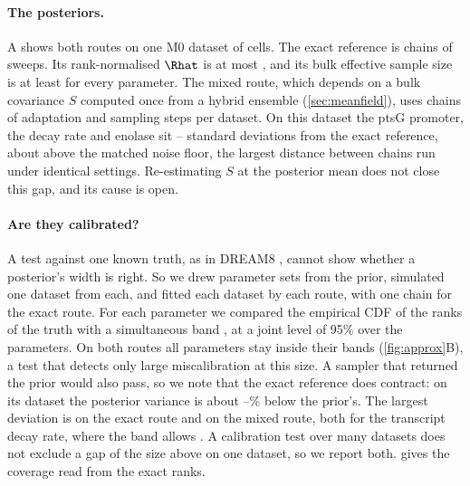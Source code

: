 \paragraph{The posteriors.} A shows both routes on one M0 dataset of
 cells. The exact reference is  chains of  sweeps. Its rank-normalised $\Rhat$
\cite{vehtari2021rank} is at most , and its bulk effective sample
size is at least  for every parameter. The mixed route, which depends on a bulk covariance $S$ computed once from a hybrid ensemble (\cref{sec:meanfield}), uses
 chains of  adaptation and 
sampling steps per dataset. On this dataset the ptsG promoter, the decay rate and
enolase sit -- standard deviations from the exact
reference, about  above the matched noise floor, the largest distance between chains run under identical settings. Re-estimating $S$ at
the posterior mean does not close this gap, and its cause is open.

\paragraph{Are they calibrated?} A test against one known truth, as in DREAM8
\cite{karr2015summary}, cannot show whether a posterior's width is right. So we drew
 parameter sets from the prior,
simulated one dataset from each, and fitted each dataset by each route, with one chain for the exact route. For each
parameter we compared the empirical CDF of the ranks of the truth with a
simultaneous band \cite{sailynoja2022graphical}, at a joint level of 95\% over the
 parameters. On both routes all  parameters stay inside their bands (\cref{fig:approx}B), a test that detects only large miscalibration at this size. A sampler that returned the prior would also pass, so we note that the exact reference does contract: on its dataset the posterior variance is about --\% below the prior's. The largest deviation is  on the exact route and  on the mixed route, both for the
transcript decay rate, where the band allows . A calibration test
over many datasets does not exclude a gap of the size above on one dataset, so we report
both.  gives the coverage read from the exact ranks.

